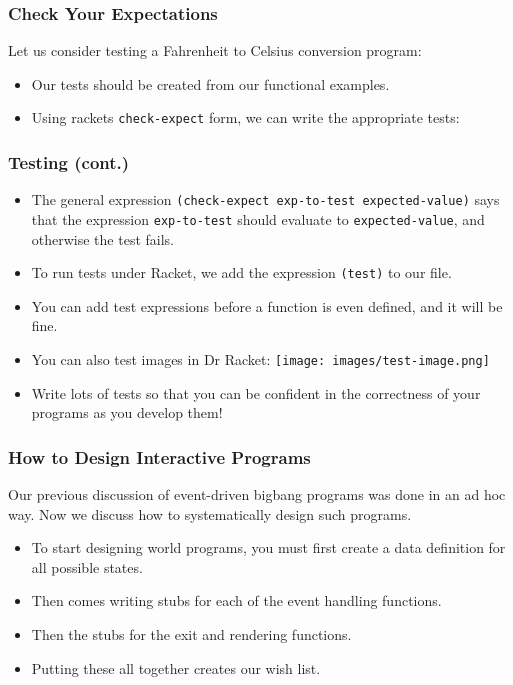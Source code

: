 \documentclass{beamer}
\begin{document}

\begin{frame}
  \frametitle{Check Your Expectations}
  Let us consider testing a Fahrenheit to Celsius conversion program:
  \testProgram
  \begin{itemize}
  \item<2-> Our tests should be created from our functional examples.
  \item<3-> Using rackets \texttt{check-expect} form, we can write the appropriate tests:
    \tests
  \end{itemize}
\end{frame}

\begin{frame}
  \frametitle{Testing (cont.)}
  \begin{itemize}
  \item  The general expression \texttt{(check-expect exp-to-test expected-value)} says that the expression \texttt{exp-to-test}
    should evaluate to \texttt{expected-value}, and otherwise the test fails.
  \item<2-> To run tests under Racket, we add the expression \texttt{(test)} to our file.
  \item<3-> You can add test expressions before a function is even defined, and it will be fine.
  \item<4-> You can also test images in Dr Racket:
    \texttt{[image: images/test-image.png]}
  \item<5-> Write lots of tests so that you can be confident in the correctness of your programs as you develop them!
  \end{itemize}
\end{frame}

\begin{frame}
  \frametitle{How to Design Interactive Programs}
  Our previous discussion of event-driven bigbang programs was done in an ad hoc way. Now we discuss how to systematically design such programs.
  \begin{itemize}
  \item<2-> To start designing world programs, you must first create a data definition for all possible states.
  \item<3-> Then comes writing stubs for each of the event handling functions.
  \item<4-> Then the stubs for the exit and rendering functions.
  \item<5-> Putting these all together creates our wish list.
  \end{itemize}
\end{frame}
\end{document}
